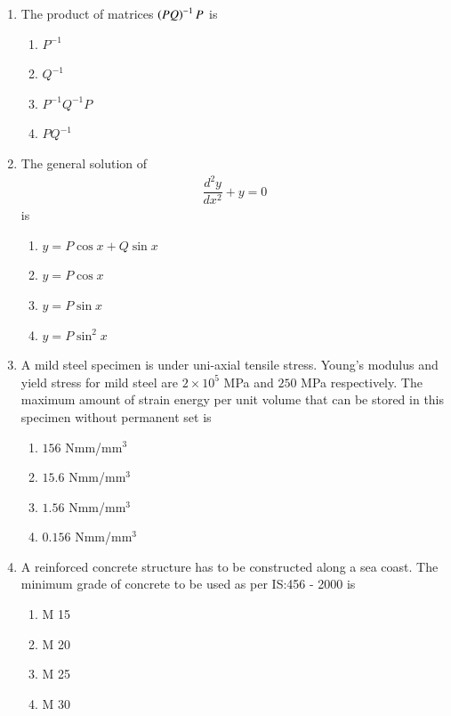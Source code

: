 \documentclass[journal]{IEEEtran}
\begin{document}
\begin{enumerate}
\item The product of matrices $\left(PQ\right)^{-1} P$ is \textbf{}
\begin{enumerate}
\item $P^{-1}$
\item $Q^{-1}$
\item $P^{-1}Q^{-1}P$
\item $PQ^{-1}$
\end{enumerate}


\item The general solution of 
\begin{align} 
\dfrac{d^2y}{dx^2} + y = 0
\end{align}
is  \textbf{}
\begin{multicols}{2}
\begin{enumerate}
\item $y = P \cos x + Q \sin x$ 
\item $y = P \cos x$ 
\item $y = P \sin x$
\item $y = P \sin^2 x$
\end{enumerate}
\end{multicols}

\item A mild steel specimen is under uni-axial tensile stress. Young's modulus and yield stress for mild steel are $2 \times 10^5$ MPa and $250$ MPa respectively. The maximum amount of strain energy per unit volume that can be stored in this specimen without permanent set is  \textbf{}

\begin{multicols}{2}
\begin{enumerate}
\item $156$ Nmm/mm$^3$ 
\item $15.6$ Nmm/mm$^3$ 
\item $1.56$ Nmm/mm$^3$ 
\item $0.156$ Nmm/mm$^3$
\end{enumerate}
\end{multicols}

\item A reinforced concrete structure has to be constructed along a sea coast. The minimum grade of concrete to be used as per IS:456 - 2000 is  \textbf{}
\begin{multicols}{4}
\begin{enumerate}
\item M 15 
\item M 20 
\item M 25 
\item M 30
\end{enumerate}
\end{multicols}


\end{enumerate}
\end{document}
